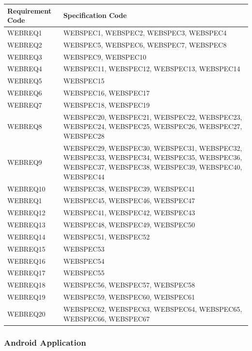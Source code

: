 \documentclass[11pt,a4paper]{article}
\begin{document}
\begin{longtable}{|p{2.7cm}|p{10cm}|}
\hline
\textbf{Requirement Code} & \textbf{Specification Code} \\

\hline
{WEBREQ1} &
{WEBSPEC1, WEBSPEC2, WEBSPEC3, WEBSPEC4}\\\hline
{WEBREQ2} &
{WEBSPEC5, WEBSPEC6, WEBSPEC7, WEBSPEC8}\\\hline
{WEBREQ3} &
{WEBSPEC9, WEBSPEC10}\\\hline
{WEBREQ4} &
{WEBSPEC11, WEBSPEC12, WEBSPEC13, WEBSPEC14}\\\hline
{WEBREQ5} &
{WEBSPEC15}\\\hline
{WEBREQ6} &
{WEBSPEC16, WEBSPEC17}\\\hline
{WEBREQ7} &
{WEBSPEC18, WEBSPEC19}\\\hline
{WEBREQ8} &
{WEBSPEC20, WEBSPEC21, WEBSPEC22, WEBSPEC23, WEBSPEC24, WEBSPEC25, WEBSPEC26, WEBSPEC27,
WEBSPEC28}\\\hline
{WEBREQ9} &
{WEBSPEC29, WEBSPEC30, WEBSPEC31, WEBSPEC32, WEBSPEC33, WEBSPEC34, WEBSPEC35, WEBSPEC36, WEBSPEC37,
WEBSPEC38, WEBSPEC39, WEBSPEC40, WEBSPEC44}\\\hline
{WEBREQ10} &
{WEBSPEC38, WEBSPEC39, WEBSPEC41}\\\hline
{WEBREQ1} &
{WEBSPEC45, WEBSPEC46, WEBSPEC47}\\\hline
{WEBREQ12} &
{WEBSPEC41, WEBSPEC42, WEBSPEC43}\\\hline
{WEBREQ13} &
{WEBSPEC48, WEBSPEC49, WEBSPEC50}\\\hline
{WEBREQ14} &
{WEBSPEC51, WEBSPEC52}\\\hline
{WEBREQ15} &
{WEBSPEC53}\\\hline
{WEBREQ16} &
{WEBSPEC54}\\\hline
{WEBREQ17} &
{WEBSPEC55}\\\hline
{WEBREQ18} &
{WEBSPEC56, WEBSPEC57, WEBSPEC58}\\\hline
{WEBREQ19} &
{WEBSPEC59, WEBSPEC60, WEBSPEC61}\\\hline
{WEBREQ20} &
{WEBSPEC62, WEBSPEC63, WEBSPEC64, WEBSPEC65, WEBSPEC66, WEBSPEC67}\\\hline 
\end{longtable}


\subsubsection{Android Application}
\end{document}
